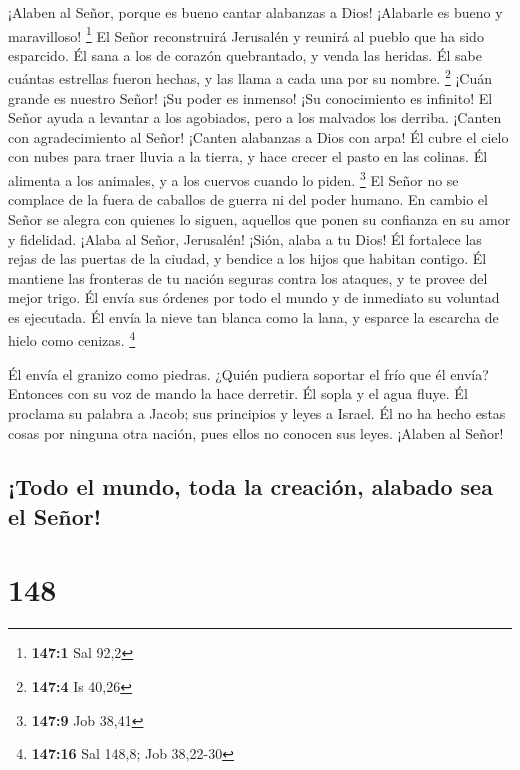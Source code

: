  ¡Alaben al Señor, porque es bueno cantar alabanzas a Dios!
¡Alabarle es bueno y maravilloso! \footnote{\textbf{147:1} Sal 92,2}
 El Señor reconstruirá Jerusalén y reunirá al pueblo que ha
sido esparcido.  Él sana a los de corazón quebrantado, y
venda las heridas.  Él sabe cuántas estrellas fueron hechas,
y las llama a cada una por su nombre. \footnote{\textbf{147:4} Is 40,26}
 ¡Cuán grande es nuestro Señor! ¡Su poder es inmenso! ¡Su
conocimiento es infinito!  El Señor ayuda a levantar a los
agobiados, pero a los malvados los derriba.  ¡Canten con
agradecimiento al Señor! ¡Canten alabanzas a Dios con arpa! 
Él cubre el cielo con nubes para traer lluvia a la tierra, y hace crecer
el pasto en las colinas.  Él alimenta a los animales, y a
los cuervos cuando lo piden. \footnote{\textbf{147:9} Job 38,41}
 El Señor no se complace de la fuera de caballos de guerra
ni del poder humano.  En cambio el Señor se alegra con
quienes lo siguen, aquellos que ponen su confianza en su amor y
fidelidad.  ¡Alaba al Señor, Jerusalén! ¡Sión, alaba a tu
Dios!  Él fortalece las rejas de las puertas de la ciudad,
y bendice a los hijos que habitan contigo.  Él mantiene las
fronteras de tu nación seguras contra los ataques, y te provee del mejor
trigo.  Él envía sus órdenes por todo el mundo y de
inmediato su voluntad es ejecutada.  Él envía la nieve tan
blanca como la lana, y esparce la escarcha de hielo como cenizas.
\footnote{\textbf{147:16} Sal 148,8; Job 38,22-30}

 Él envía el granizo como piedras. ¿Quién pudiera soportar
el frío que él envía?  Entonces con su voz de mando la hace
derretir. Él sopla y el agua fluye.  Él proclama su palabra
a Jacob; sus principios y leyes a Israel.  Él no ha hecho
estas cosas por ninguna otra nación, pues ellos no conocen sus leyes.
¡Alaben al Señor!

\hypertarget{todo-el-mundo-toda-la-creaciuxf3n-alabado-sea-el-seuxf1or}{%
\subsection{¡Todo el mundo, toda la creación, alabado sea el
Señor!}\label{todo-el-mundo-toda-la-creaciuxf3n-alabado-sea-el-seuxf1or}}

\hypertarget{section-147}{%
\section{148}\label{section-147}}

